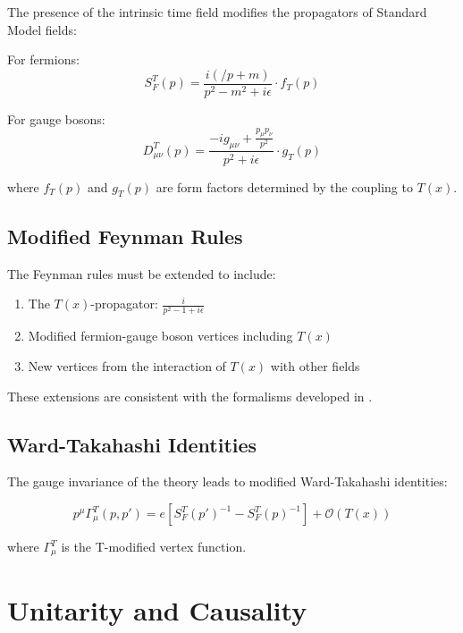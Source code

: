 \documentclass[12pt,a4paper]{article}
\newcommand{\Tfield}{T(x)}
\begin{document}
	The presence of the intrinsic time field modifies the propagators of Standard Model fields:
	
	For fermions:
	\begin{equation}
		S_F^T(p) = \frac{i(\slash{p} + m)}{p^2 - m^2 + i\epsilon} \cdot f_T(p)
	\end{equation}
	
	For gauge bosons:
	\begin{equation}
		D_{\mu\nu}^T(p) = \frac{-ig_{\mu\nu} + \frac{p_{\mu}p_{\nu}}{p^2}}{p^2 + i\epsilon} \cdot g_T(p)
	\end{equation}
	
	where $f_T(p)$ and $g_T(p)$ are form factors determined by the coupling to $\Tfield$.
	
	\subsection{Modified Feynman Rules}
	\label{sec:feynman_regeln}
	
	The Feynman rules must be extended to include:
	
	\begin{enumerate}
		\item The $\Tfield$-propagator: $\frac{i}{p^2 - 1 + i\epsilon}$
		\item Modified fermion-gauge boson vertices including $\Tfield$
		\item New vertices from the interaction of $\Tfield$ with other fields
	\end{enumerate}
	
	These extensions are consistent with the formalisms developed in \cite{pascher_formalismen_2025_en}.
	
	\subsection{Ward-Takahashi Identities}
	\label{sec:ward_identitaeten}
	
	The gauge invariance of the theory leads to modified Ward-Takahashi identities:
	
	\begin{equation}
		p^{\mu}\Gamma_{\mu}^T(p,p') = e[S_F^T(p')^{-1} - S_F^T(p)^{-1}] + \mathcal{O}(\Tfield)
	\end{equation}
	
	where $\Gamma_{\mu}^T$ is the T-modified vertex function.
	
	\section{Unitarity and Causality}
	\label{sec:unitaritaet_kausalitaet}
	
\end{document}
